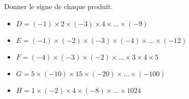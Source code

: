 \begin{exercice*}
    Donner le signe de chaque produit.
    \begin{itemize}
        \item[] $D = (-1)\times 2\times (-3)\times 4\times\ldots \times (-9) $
        \item[] $E = (-1)\times(-2)\times(-3)\times(-4)\times\ldots\times (-12) $
        \item[] $F = (-4)\times(-3)\times(-2)\times\ldots\times 3\times 4\times 5$
        \item[] $G = 5\times (-10)\times 15\times (-20)\times\ldots\times (-100)$
        \item[] $H = 1\times (-2)\times 4\times (-8)\times\ldots\times \num{1024}$
    \end{itemize}
\end{exercice*}
